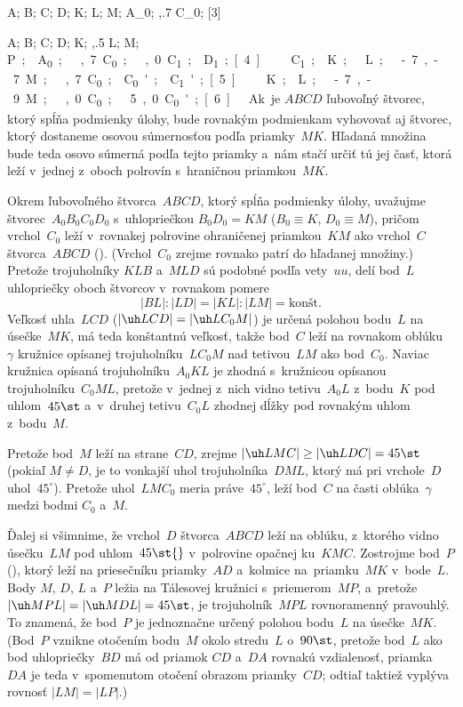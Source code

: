 {%
\fontplace
\tpoint A;
\tpoint B;
\blpoint C;
\bpoint D;
\rtpoint K;
\rpoint{} L;
\lbpoint M;
\rpoint A_0;
\bpoint{},.7 C_0;
[3] \hfil\Obr

\fontplace
\tpoint A;
\tpoint B;
\blpoint C;
\bpoint D;
\rtpoint K;
\rpoint{},.5 L;
\lbpoint M;
\rpoint\down\unit P;
\rpoint A_0;
\bpoint{},.7 C_0;
\tpoint{},0 C_1;
\rpoint D_1;
[4] \hfil\Obr

\fontplace
\bpoint C_1;
\rtpoint K;
\rpoint{} L;
\rpoint\xy-.7,-.7 M;
\bpoint{},.7 C_0;
\tpoint C_0'; \bpoint C_1';
[5] \hfil\Obr

\fontplace
\rtpoint K;
\rBpoint L;
\rpoint\xy-.7,-.9 M;
\tpoint{},0 C_0;
\tpoint\xy.5,0 C_0';
[6] \hfil\Obr

Ak je $ABCD$ ľubovoľný štvorec, ktorý spĺňa podmienky úlohy,
bude rovnakým podmienkam vyhovovať aj štvorec, ktorý dostaneme
osovou súmernosťou podľa priamky~$MK$. Hľadaná množina bude teda
osovo súmerná podľa tejto priamky a~nám stačí určiť tú jej
časť, ktorá leží v~jednej z~oboch polrovín s~hraničnou priamkou~$MK$.

Okrem ľubovoľného štvorca~$ABCD$, ktorý spĺňa podmienky úlohy,
uvažujme štvorec~$A_0B_0C_0D_0$ s~uhlopriečkou $B_0D_0=KM$ ($B_0
\equiv K$, $D_0 \equiv M$), pričom vrchol~$C_0$ leží v~rovnakej
polrovine ohraničenej priamkou~$KM$ ako vrchol~$C$ štvorca~$ABCD$ (\obr).
(Vrchol~$C_0$ zrejme rovnako patrí do hľadanej množiny.)
\midinsert
\line{\qquad\inspicture-!\hss \inspicture-!\quad}
\endinsert
Pretože trojuholníky $KLB$ a~$MLD$ sú podobné podľa vety~$uu$, delí bod~$L$ uhlopriečky oboch štvorcov v~rovnakom pomere
$$
|BL|:|LD| = |KL|:|LM| = \text{konšt.}
$$
Veľkosť uhla~$LCD$ ($|\uh LCD|=|\uh LC_0M|$) je určená polohou
bodu~$L$ na úsečke~$MK$, má teda konštantnú veľkosť, takže bod~$C$
leží na rovnakom oblúku~$\gamma$ kružnice opísanej trojuholníku~$LC_0M$
nad tetivou~$LM$ ako bod~$C_0$. Naviac kružnica opísaná
trojuholníku~$A_0KL$ je zhodná s~kružnicou opísanou trojuholníku~$C_0ML$, pretože
v~jednej z~nich vidno tetivu~$A_0L$ z~bodu~$K$ pod uhlom~$45\st$
a~v~druhej tetivu~$C_0L$ zhodnej dĺžky pod rovnakým uhlom
z~bodu~$M$.

Pretože bod~$M$ leží na strane~$CD$, zrejme $|\uh LMC|\ge|\uh
LDC|=45\st$ (pokiaľ $M\ne D$, je to vonkajší uhol trojuholníka~$DML$,
ktorý má pri vrchole~$D$ uhol~$45^{\circ}$). Pretože uhol~$LMC_0$
meria práve~$45^{\circ}$, leží bod~$C$ na časti oblúka~$\gamma$ medzi bodmi $C_0$ a~$M$.

Ďalej si všimnime, že vrchol~$D$ štvorca~$ABCD$ leží na oblúku,
z~ktorého vidno úsečku~$LM$ pod uhlom~$45\st{}$ v~polrovine
opačnej ku~$KMC$. Zostrojme bod~$P$ (\obr), ktorý leží na
priesečníku priamky~$AD$ a~kolmice na~priamku~$MK$ v~bode~$L$. Body
$M$, $D$, $L$ a~$P$ ležia na Tálesovej kružnici s~priemerom~$MP$, 
a~pretože $|\uh MPL|=|\uh MDL|=45\st$, je trojuholník~$MPL$ rovnoramenný
pravouhlý. To znamená, že bod~$P$ je jednoznačne určený polohou
bodu~$L$ na úsečke~$MK$. 
(Bod~$P$ vznikne otočením bodu~$M$ okolo stredu~$L$
o~$90\st$, pretože bod~$L$ ako bod uhlopriečky~$BD$ má od priamok
$CD$ a~$DA$ rovnakú vzdialenosť, priamka~$DA$ je teda v~spomenutom
otočení obrazom priamky~$CD$; odtiaľ taktiež vyplýva rovnosť
$|LM|=|LP|$.)

}
